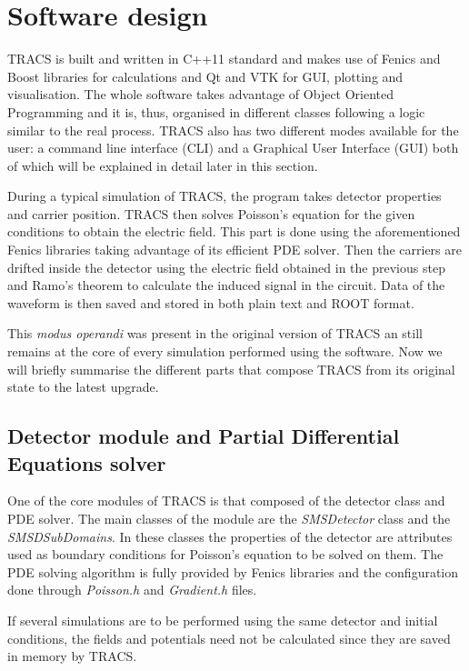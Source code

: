 \section{Software design} %
\label{sec:results_and_achievements}

TRACS is built and written in C++11 standard and makes use of Fenics and Boost libraries for calculations and Qt and VTK for GUI, plotting and visualisation. The whole software takes advantage of Object Oriented Programming and it is, thus, organised in different classes following a logic similar to the real process. TRACS also has two different modes available for the user: a command line interface (CLI) and a Graphical User Interface (GUI) both of which will be explained in detail later in this section.

During a typical simulation of TRACS, the program takes detector properties and carrier position. TRACS then solves Poisson's equation for the given conditions to obtain the electric field. This part is done using the aforementioned Fenics libraries taking advantage of its efficient PDE solver. Then the carriers are drifted inside the detector using the electric field obtained in the previous step and Ramo's theorem to calculate the induced signal in the circuit. Data of the waveform is then saved and stored in both plain text and ROOT format.

This \textit{modus operandi} was present in the original version of TRACS an still remains at the core of every simulation performed using the software. Now we will briefly summarise the different parts that compose TRACS from its original state to the latest upgrade.

\subsection{Detector module and Partial Differential Equations solver}

One of the core modules of TRACS is that composed of the detector class and PDE solver. The main classes of the module are the \textit{SMSDetector} class and the \textit{SMSDSubDomains}. In these classes the properties of the detector are attributes used as boundary conditions for Poisson's equation to be solved on them. The PDE solving algorithm is fully provided by Fenics libraries and the configuration done through \textit{Poisson.h} and \textit{Gradient.h} files.

If several simulations are to be performed using the same detector and initial conditions, the fields and potentials need not be calculated since they are saved in memory by TRACS. 

